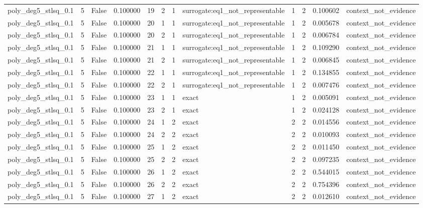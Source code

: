 \begin{tabular}{lrrrrrrlrrrl}
poly\_deg5\_stlsq\_0.1 & 5 & False & 0.100000 & 19 & 2 & 1 & surrogate:eq1\_not\_representable & 1 & 2 & 0.100602 & context\_not\_evidence \\
poly\_deg5\_stlsq\_0.1 & 5 & False & 0.100000 & 20 & 1 & 1 & surrogate:eq1\_not\_representable & 1 & 2 & 0.005678 & context\_not\_evidence \\
poly\_deg5\_stlsq\_0.1 & 5 & False & 0.100000 & 20 & 2 & 1 & surrogate:eq1\_not\_representable & 1 & 2 & 0.006784 & context\_not\_evidence \\
poly\_deg5\_stlsq\_0.1 & 5 & False & 0.100000 & 21 & 1 & 1 & surrogate:eq1\_not\_representable & 1 & 2 & 0.109290 & context\_not\_evidence \\
poly\_deg5\_stlsq\_0.1 & 5 & False & 0.100000 & 21 & 2 & 1 & surrogate:eq1\_not\_representable & 1 & 2 & 0.006845 & context\_not\_evidence \\
poly\_deg5\_stlsq\_0.1 & 5 & False & 0.100000 & 22 & 1 & 1 & surrogate:eq1\_not\_representable & 1 & 2 & 0.134855 & context\_not\_evidence \\
poly\_deg5\_stlsq\_0.1 & 5 & False & 0.100000 & 22 & 2 & 1 & surrogate:eq1\_not\_representable & 1 & 2 & 0.007476 & context\_not\_evidence \\
poly\_deg5\_stlsq\_0.1 & 5 & False & 0.100000 & 23 & 1 & 1 & exact & 1 & 2 & 0.005091 & context\_not\_evidence \\
poly\_deg5\_stlsq\_0.1 & 5 & False & 0.100000 & 23 & 2 & 1 & exact & 1 & 2 & 0.024128 & context\_not\_evidence \\
poly\_deg5\_stlsq\_0.1 & 5 & False & 0.100000 & 24 & 1 & 2 & exact & 2 & 2 & 0.014556 & context\_not\_evidence \\
poly\_deg5\_stlsq\_0.1 & 5 & False & 0.100000 & 24 & 2 & 2 & exact & 2 & 2 & 0.010093 & context\_not\_evidence \\
poly\_deg5\_stlsq\_0.1 & 5 & False & 0.100000 & 25 & 1 & 2 & exact & 2 & 2 & 0.011450 & context\_not\_evidence \\
poly\_deg5\_stlsq\_0.1 & 5 & False & 0.100000 & 25 & 2 & 2 & exact & 2 & 2 & 0.097235 & context\_not\_evidence \\
poly\_deg5\_stlsq\_0.1 & 5 & False & 0.100000 & 26 & 1 & 2 & exact & 2 & 2 & 0.544015 & context\_not\_evidence \\
poly\_deg5\_stlsq\_0.1 & 5 & False & 0.100000 & 26 & 2 & 2 & exact & 2 & 2 & 0.754396 & context\_not\_evidence \\
poly\_deg5\_stlsq\_0.1 & 5 & False & 0.100000 & 27 & 1 & 2 & exact & 2 & 2 & 0.012610 & context\_not\_evidence \\

\end{tabular}
